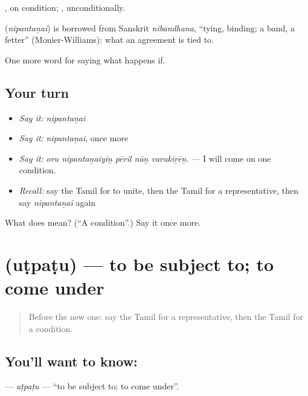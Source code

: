  , on condition; , unconditionally.

\begin{cousinweb}
\textbf{} (\emph{nipantaṉai}) is borrowed from Sanskrit \emph{nibandhana}, \textquotedblleft{}tying, binding; a band, a fetter\textquotedblright{} (Monier-Williams): what an agreement is tied to.
\end{cousinweb}

\begin{grammarlens}[title={What you've built}]
One more word for saying what happens if.
\end{grammarlens}

\subsection*{Your turn}
\begin{itemize}
\raggedright
  \item \emph{Say it:} \emph{nipantaṉai}
  \item \emph{Say it:} \emph{nipantaṉai}, once more
  \item \emph{Say it:} \emph{oru nipantaṉaiyiṉ pēril nāṉ varukiṟēṉ.} — I will come on one condition.
  \item \emph{Recall:} say the Tamil for to unite, then the Tamil for a representative, then say \emph{nipantaṉai} again
\end{itemize}

\begin{tcolorbox}[breakable,colback=teal!4,colframe=teal!35!black,title={Before you move on}]
What does  mean? (\textquotedblleft{}A condition\textquotedblright{}.) Say it once more.
\end{tcolorbox}
\section[\texorpdfstring{\ta{உட்படு} (uṭpaṭu)}{உட்படு (uṭpaṭu)}]{ (uṭpaṭu) — to be subject to; to come under}

\label{lesson:TA-C382-utpatu}



\begin{quote}
Before the new one: say the Tamil for a representative, then the Tamil for a condition.
\end{quote}

\subsection*{You'll want to know: }
\textbf{} — \emph{uṭpaṭu} — \textquotedblleft{}to be subject to; to come under\textquotedblright{}.

